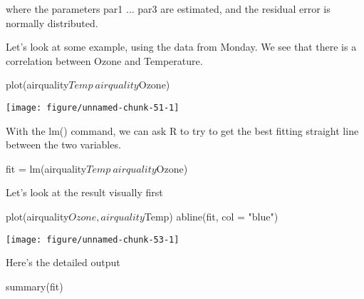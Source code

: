 \documentclass[a4paper,twoside]{tufte-book}\usepackage[]{graphicx}\usepackage[]{color}
\makeatletter
\def\maxwidth{ %
	\ifdim\Gin@nat@width>\linewidth
	\linewidth
	\else
	\Gin@nat@width
	\fi
}
\makeatother
\begin{document}
\begin{Anhang}
where the parameters par1 ... par3 are estimated, and the residual error is normally distributed. 

Let's look at some example, using the data from Monday. We see that there is a correlation between Ozone and Temperature. 

\begin{Schunk}
\begin{Sinput}
plot(airquality$Temp~airquality$Ozone)
\end{Sinput}

\texttt{[image: figure/unnamed-chunk-51-1]} \end{Schunk}

With the lm() command, we can ask R to try to get the best fitting straight line between the two variables. 

\begin{Schunk}
\begin{Sinput}
fit = lm(airquality$Temp~airquality$Ozone)
\end{Sinput}
\end{Schunk}

Let's look at the result visually first

\begin{Schunk}
\begin{Sinput}
plot(airquality$Ozone, airquality$Temp)
abline(fit, col = "blue")
\end{Sinput}

\texttt{[image: figure/unnamed-chunk-53-1]} \end{Schunk}

Here's the detailed output

\begin{Schunk}
\begin{Sinput}
summary(fit)
\end{Sinput}
\end{Schunk}


\end{Anhang}
\end{document}
